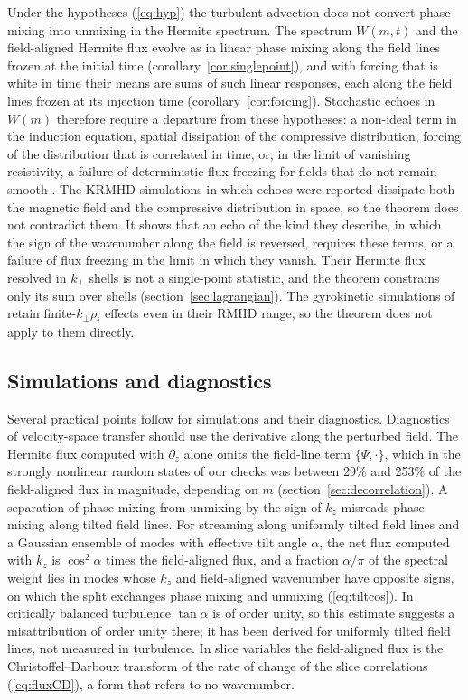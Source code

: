 Under the hypotheses (\ref{eq:hyp}) the turbulent advection does not convert phase mixing into unmixing in the Hermite spectrum. The spectrum $W(m,t)$ and the field-aligned Hermite flux evolve as in linear phase mixing along the field lines frozen at the initial time (corollary~\ref{cor:singlepoint}), and with forcing that is white in time their means are sums of such linear responses, each along the field lines frozen at its injection time (corollary~\ref{cor:forcing}). Stochastic echoes in $W(m)$ therefore require a departure from these hypotheses: a non-ideal term in the induction equation, spatial dissipation of the compressive distribution, forcing of the distribution that is correlated in time, or, in the limit of vanishing resistivity, a failure of deterministic flux freezing for fields that do not remain smooth \citep{Eyink2013,Eyink2018,Jafari2026}. The KRMHD simulations in which echoes were reported \citep{Meyrand2019} dissipate both the magnetic field and the compressive distribution in space, so the theorem does not contradict them. It shows that an echo of the kind they describe, in which the sign of the wavenumber along the field is reversed, requires these terms, or a failure of flux freezing in the limit in which they vanish. Their Hermite flux resolved in $k_\perp$ shells is not a single-point statistic, and the theorem constrains only its sum over shells (section~\ref{sec:lagrangian}). The gyrokinetic simulations of \citet{Kawazura2020} retain finite-$k_\perp\rho_i$ effects even in their RMHD range, so the theorem does not apply to them directly.

\subsection{Simulations and diagnostics}\label{dis:numerics}

Several practical points follow for simulations and their diagnostics. Diagnostics of velocity-space transfer should use the derivative along the perturbed field. The Hermite flux computed with $\partial_z$ alone omits the field-line term $\{\Psi,\cdot\}$, which in the strongly nonlinear random states of our checks was between 29\% and 253\% of the field-aligned flux in magnitude, depending on $m$ (section~\ref{sec:decorrelation}). A separation of phase mixing from unmixing by the sign of $k_z$ misreads phase mixing along tilted field lines. For streaming along uniformly tilted field lines and a Gaussian ensemble of modes with effective tilt angle $\alpha$, the net flux computed with $k_z$ is $\cos^2\alpha$ times the field-aligned flux, and a fraction $\alpha/\pi$ of the spectral weight lies in modes whose $k_z$ and field-aligned wavenumber have opposite signs, on which the split exchanges phase mixing and unmixing (\ref{eq:tiltcos}). In critically balanced turbulence $\tan\alpha$ is of order unity, so this estimate suggests a misattribution of order unity there; it has been derived for uniformly tilted field lines, not measured in turbulence. In slice variables the field-aligned flux is the Christoffel--Darboux transform of the rate of change of the slice correlations (\ref{eq:fluxCD}), a form that refers to no wavenumber.

